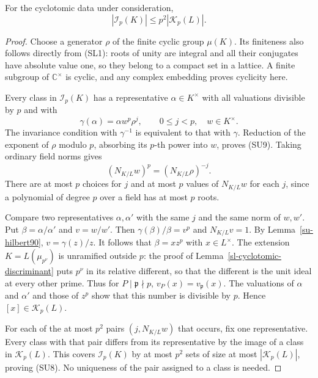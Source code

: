 \begin{lemma}\label{su-invariant-kummer}
For the cyclotomic data under consideration,
\[
                |\mathcal I_p(K)|
                     \le p^2|\mathcal K_p(L)|.
                     \tag{SU8}
\]
\end{lemma}
\begin{proof}
Choose a generator $\rho$ of the finite cyclic group
$\mu(K)$.  Its finiteness also follows directly from
(SL1): roots of unity are integral and all their conjugates
have absolute value one, so they belong to a compact set
in a lattice.  A finite subgroup of $\mathbb C^\times$
is cyclic, and any complex embedding proves cyclicity here.

Every class in $\mathcal I_p(K)$ has a representative
$\alpha\in K^\times$ with all valuations divisible by $p$
and with
\[
           \gamma(\alpha)=\alpha w^p\rho^j,
              \qquad 0\le j<p,\quad w\in K^\times .
              \tag{SU9}
\]
The invariance condition with $\gamma^{-1}$ is equivalent
to that with $\gamma$.  Reduction of the exponent of
$\rho$ modulo $p$, absorbing its $p$-th power into $w$,
proves (SU9).
Taking ordinary field norms gives
\[
                     (N_{K/L}w)^p=(N_{K/L}\rho)^{-j}.
\]
There are at most $p$ choices for $j$ and at most $p$
values of $N_{K/L}w$ for each $j$, since a polynomial of
degree $p$ over a field has at most $p$ roots.

Compare two representatives $\alpha,\alpha'$ with the
same $j$ and the same norm of $w,w'$.  Put
$\beta=\alpha/\alpha'$ and $v=w/w'$.
Then $\gamma(\beta)/\beta=v^p$ and $N_{K/L}v=1$.
By Lemma~\ref{su-hilbert90}, $v=\gamma(z)/z$.
It follows that $\beta=xz^p$ with $x\in L^\times$.
The extension $K=L(\mu_{p^\nu})$ is unramified outside $p$:
the proof of Lemma~\ref{sl-cyclotomic-discriminant} puts
$p^\nu$ in its relative different, so that the different
is the unit ideal at every other prime.
Thus for $P\mid\mathfrak p\nmid p$,
$v_P(x)=v_{\mathfrak p}(x)$.
The valuations of $\alpha$ and $\alpha'$ and those of
$z^p$ show that this number is divisible by $p$.
Hence $[x]\in\mathcal K_p(L)$.

For each of the at most $p^2$ pairs
$(j,N_{K/L}w)$ that occurs, fix one representative.
Every class with that pair differs from its representative
by the image of a class in $\mathcal K_p(L)$.
This covers $\mathcal I_p(K)$ by at most $p^2$ sets of
size at most $|\mathcal K_p(L)|$, proving (SU8).
No uniqueness of the pair assigned to a class is needed.
\end{proof}

